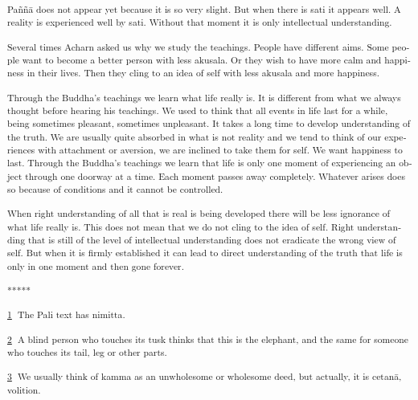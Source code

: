 \textsuperscript{\textdutch{Paññā does not appear yet because it is so
very slight. But when there is sati it appears well. A reality is
experienced well by sati. Without that moment it is only intellectual
understanding. }}

\textsuperscript{\textdutch{Several times Acharn asked us why we study
the teachings. People have different aims. Some people want to become a
better person with less akusala. Or they wish to have more calm and
happiness in their lives. Then they cling to an idea of self with less
akusala and more happiness. }}

\textsuperscript{\textdutch{Through the Buddha's teachings we learn what
life really is. It is different from what we always thought before
hearing his teachings. We used to think that all events in life last for
a while, being sometimes pleasant, sometimes unpleasant. It takes a long
time to develop understanding of the truth. We are usually quite
absorbed in what is not reality and we tend to think of our experiences
with attachment or aversion, we are inclined to take them for self. We
want happiness to last. Through the Buddha's teachings we learn that
life is only one moment of experiencing an object through one doorway at
a time. Each moment passes away completely. Whatever arises does so
because of conditions and it cannot be controlled. }}

\textsuperscript{\textdutch{When right understanding of all that is real
is being developed there will be less ignorance of what life really is.
This does not mean that we do not cling to the idea of self. Right
understanding that is still of the level of intellectual understanding
does not eradicate the wrong view of self. But when it is firmly
established it can lead to direct understanding of the truth that life
is only in one moment and then gone forever. }}

\textsuperscript{\textdutch{*****}}

\hypertarget{sdfootnote1}{}
\textsuperscript{\protect\hyperlink{sdfootnote1anc}{1} \textdutch{The
Pali text has nimitta.}}

\hypertarget{sdfootnote2}{}
\textsuperscript{\protect\hyperlink{sdfootnote2anc}{2} \textdutch{A
blind person who touches its tusk thinks that this is the elephant, and
the same for someone who touches its tail, leg or other parts. }}

\hypertarget{sdfootnote3}{}
\textsuperscript{\protect\hyperlink{sdfootnote3anc}{3} \textdutch{We
usually think of kamma as an unwholesome or wholesome deed, but
actually, it is cetanā, volition. }}

